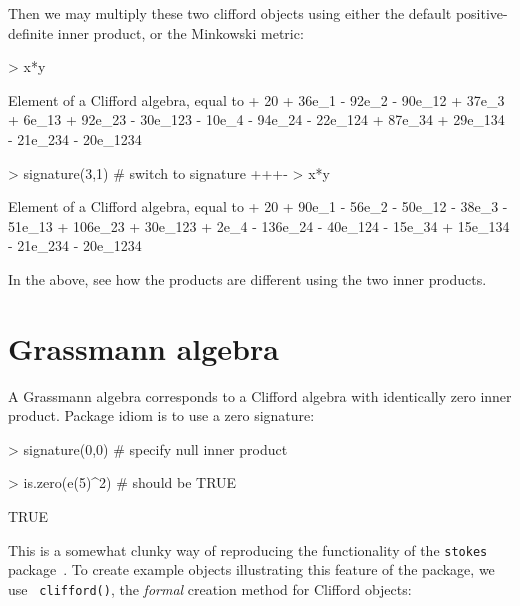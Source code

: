 \documentclass{birkjour}
\theoremstyle{definition}
\theoremstyle{remark}
\numberwithin{equation}{section}
\begin{document}
Then we may multiply these two clifford objects using either the
default positive-definite inner product, or the Minkowski metric:

\begin{Schunk}
\begin{Sinput}
> x*y
\end{Sinput}
\begin{Soutput}
Element of a Clifford algebra, equal to
+ 20 + 36e_1 - 92e_2 - 90e_12 + 37e_3 + 6e_13 + 92e_23 - 30e_123 - 10e_4 -
94e_24 - 22e_124 + 87e_34 + 29e_134 - 21e_234 - 20e_1234
\end{Soutput}
\begin{Sinput}
> signature(3,1)  # switch to signature +++-
> x*y
\end{Sinput}
\begin{Soutput}
Element of a Clifford algebra, equal to
+ 20 + 90e_1 - 56e_2 - 50e_12 - 38e_3 - 51e_13 + 106e_23 + 30e_123 + 2e_4 -
136e_24 - 40e_124 - 15e_34 + 15e_134 - 21e_234 - 20e_1234
\end{Soutput}
\end{Schunk}

In the above, see how the products are different using the two inner
products.  

\section{Grassmann algebra}

A Grassmann algebra corresponds to a Clifford algebra with identically
zero inner product.  Package idiom is to use a zero signature:

\begin{Schunk}
\begin{Sinput}
> signature(0,0)  # specify null inner product
\end{Sinput}
\end{Schunk}
\begin{Schunk}
\begin{Sinput}
> is.zero(e(5)^2)     # should be TRUE
\end{Sinput}
\begin{Soutput}
[1] TRUE
\end{Soutput}
\end{Schunk}

This is a somewhat clunky way of reproducing the functionality of the
{\tt stokes} package~\cite{hankin2022_stokes_arxiv}.  To create
example objects illustrating this feature of the package, we use {\tt
  clifford()}, the {\em formal} creation method for Clifford objects:
\end{document}
